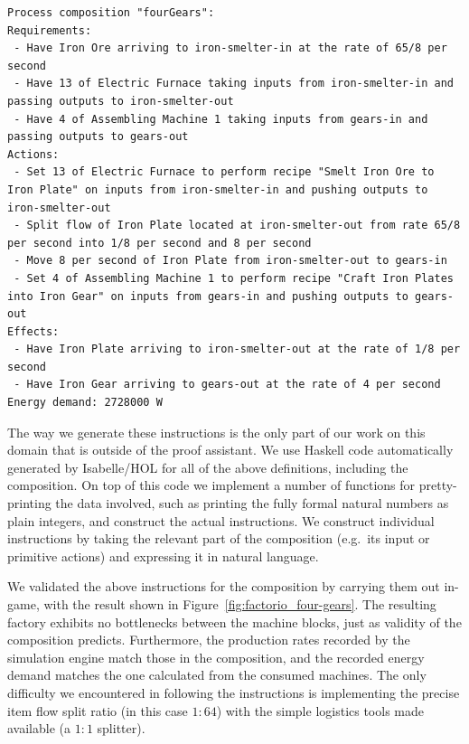 \documentclass[class=smolathesis,crop=false]{standalone}
\begin{document}
\begin{lstlisting}[label=lst:fourGears-instr,caption=Instructions for the \isa{fourGears} composition,basicstyle=\small\ttfamily,columns=flexible,breaklines=true]
Process composition "fourGears":
Requirements:
 - Have Iron Ore arriving to iron-smelter-in at the rate of 65/8 per second
 - Have 13 of Electric Furnace taking inputs from iron-smelter-in and passing outputs to iron-smelter-out
 - Have 4 of Assembling Machine 1 taking inputs from gears-in and passing outputs to gears-out
Actions:
 - Set 13 of Electric Furnace to perform recipe "Smelt Iron Ore to Iron Plate" on inputs from iron-smelter-in and pushing outputs to iron-smelter-out
 - Split flow of Iron Plate located at iron-smelter-out from rate 65/8 per second into 1/8 per second and 8 per second
 - Move 8 per second of Iron Plate from iron-smelter-out to gears-in
 - Set 4 of Assembling Machine 1 to perform recipe "Craft Iron Plates into Iron Gear" on inputs from gears-in and pushing outputs to gears-out
Effects:
 - Have Iron Plate arriving to iron-smelter-out at the rate of 1/8 per second
 - Have Iron Gear arriving to gears-out at the rate of 4 per second
Energy demand: 2728000 W
\end{lstlisting}

The way we generate these instructions is the only part of our work on this domain that is outside of the proof assistant.
We use Haskell code automatically generated by Isabelle/HOL for all of the above definitions, including the  composition.
On top of this code we implement a number of functions for pretty-printing the data involved, such as printing the fully formal natural numbers as plain integers, and construct the actual instructions.
We construct individual instructions by taking the relevant part of the composition (e.g.\ its input or primitive actions) and expressing it in natural language.

We validated the above instructions for the  composition by carrying them out in-game, with the result shown in Figure~\ref{fig:factorio_four-gears}.
The resulting factory exhibits no bottlenecks between the machine blocks, just as validity of the composition predicts.
Furthermore, the production rates recorded by the simulation engine match those in the composition, and the recorded energy demand matches the one calculated from the consumed machines.
The only difficulty we encountered in following the instructions is implementing the precise item flow split ratio (in this case $1:64$) with the simple logistics tools made available (a $1:1$ splitter).
\end{document}
